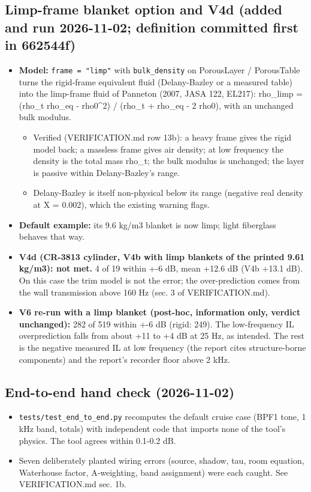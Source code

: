 \documentclass[10pt,a4paper]{article}
\begin{document}
\subsection*{Limp-frame blanket option and V4d (added and run 2026-11-02; definition committed first in 662544f)}

\begin{itemize}
\item \textbf{Model:} \texttt{frame = "limp"} with \texttt{bulk\_\allowbreak{}density} on PorousLayer / PorousTable turns the rigid-frame equivalent fluid (Delany-Bazley or a measured table) into the limp-frame fluid of Panneton (2007, JASA 122, EL217): rho\_limp = (rho\_t rho\_eq - rho0\textasciicircum{}2) / (rho\_t + rho\_eq - 2 rho0), with an unchanged bulk modulus.
\begin{itemize}
\item Verified (VERIFICATION.md row 13b): a heavy frame gives the rigid model back; a massless frame gives air density; at low frequency the density is the total mass rho\_t; the bulk modulus is unchanged; the layer is passive within Delany-Bazley's range.
\item Delany-Bazley is itself non-physical below its range (negative real density at X = 0.002), which the existing warning flags.
\end{itemize}
\item \textbf{Default example:} its 9.6 kg/m3 blanket is now limp; light fiberglass behaves that way.
\item \textbf{V4d (CR-3813 cylinder, V4b with limp blankets of the printed 9.61 kg/m3): not met.} 4 of 19 within +-6 dB, mean +12.6 dB (V4b +13.1 dB). On this case the trim model is not the error; the over-prediction comes from the wall transmission above 160 Hz (sec. 3 of VERIFICATION.md).
\item \textbf{V6 re-run with a limp blanket (post-hoc, information only, verdict unchanged):} 282 of 519 within +-6 dB (rigid: 249). The low-frequency IL overprediction falls from about +11 to +4 dB at 25 Hz, as intended. The rest is the negative measured IL at low frequency (the report cites structure-borne components) and the report's recorder floor above 2 kHz.
\end{itemize}

\subsection*{End-to-end hand check (2026-11-02)}

\begin{itemize}
\item \texttt{tests/\allowbreak{}test\_\allowbreak{}end\_\allowbreak{}to\_\allowbreak{}end.\allowbreak{}py} recomputes the default cruise case (BPF1 tone, 1 kHz band, totals) with independent code that imports none of the tool's physics. The tool agrees within 0.1-0.2 dB.
\item Seven deliberately planted wiring errors (source, shadow, tau, room equation, Waterhouse factor, A-weighting, band assignment) were each caught. See VERIFICATION.md sec. 1b.
\end{itemize}
\end{document}
